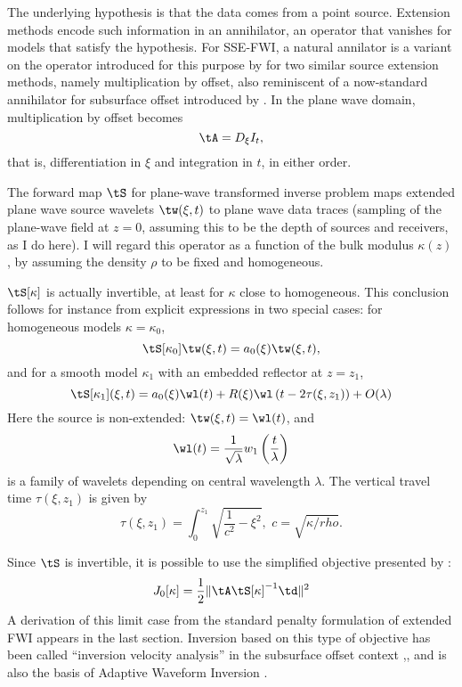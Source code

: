 The underlying hypothesis is that the data comes from a point
source. Extension methods encode such information in an annihilator,
an operator that vanishes for models that satisfy the hypothesis. For
SSE-FWI, a natural annilator is a variant on the operator introduced
for this purpose by \cite{HuangSymes:Geo18a,HuangSymes:Geo18b} for two
similar source extension methods, namely multiplication by offset,
also reminiscent of a now-standard annihilator for subsurface offset
introduced by \cite{stolk2001c}. In the plane wave domain,
multiplication by offset becomes 
\[
\tA = D_{\xi}I_t,
\]
that is, differentiation in $\xi$ and integration in $t$, in either
order.

The forward map $\tS$ for plane-wave transformed inverse problem maps
extended plane wave source wavelets $\tw(\xi,t)$ to plane wave data
traces (sampling of the plane-wave field at $z=0$, assuming this to be the
depth of sources and receivers, as I do here). I will regard this operator as a
function of the bulk modulus $\kappa(z)$, by assuming the density
$\rho$ to be fixed and homogeneous. 

$\tS[\kappa]$ is 
actually invertible, at least for $\kappa$ close to homogeneous. This conclusion follows for instance
from explicit expressions in two special cases: for homogeneous models
$\kappa=\kappa_0$, 
\[
\tS[\kappa_0]\tw(\xi,t) = a_0(\xi)\tw(\xi,t),
\]
and for a smooth model $\kappa_1$ with an embedded reflector at $z=z_1$,
\[
\tS[\kappa_1](\xi,t) = a_0(\xi)\wl(t) +
R(\xi)\wl\left(t-2\tau(\xi,z_1)\right) + O(\lambda)
\]
Here the source is non-extended: $\tw(\xi,t)=\wl(t)$, and 
\[
\wl(t)=\frac{1}{\sqrt{\lambda}}w_1\left(\frac{t}{\lambda}\right)
\]
is a family of wavelets depending on central wavelength $\lambda$. The
vertical travel time $\tau(\xi,z_1)$ is given by
\[
\tau(\xi,z_1) = \int_0^{z_1}\sqrt{\frac{1}{c^2}-\xi^2},\,\,c=\sqrt{\kappa/rho}.
\]

Since $\tS$ is invertible, it is possible to use the
simplified objective presented by
\cite{Symes:EAGE15}:
\begin{equation}
\label{eqn:dsobj}
J_0[\kappa]=\frac{1}{2}\|\tA \tS[\kappa]^{-1}\td\|^2
\end{equation}
A derivation of this limit case from the standard penalty formulation
of extended FWI 
appears in the last section. Inversion based on this type of objective
has been called ``inversion velocity analysis'' in the subsurface
offset context \cite[]{Herve2017},\cite[]{HouSymes:Geo18}, and is also the
basis of Adaptive Waveform Inversion
\cite{Warner:14,Warner:16}.

